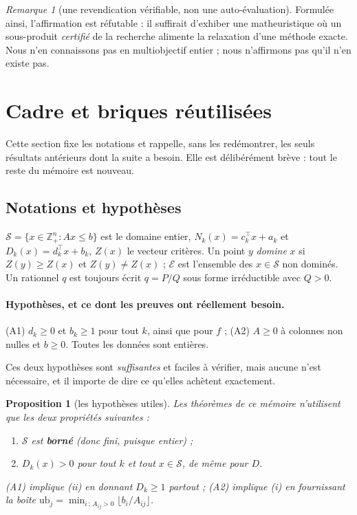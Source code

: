 \documentclass[11pt,a4paper]{article}
\theoremstyle{plain}
\newtheorem{proposition}[theorem]{Proposition}
\theoremstyle{remark}
\newtheorem{remark}{Remarque}
\newcommand{\Nk}{N_k}
\newcommand{\Dk}{D_k}
\newcommand{\Ecal}{\mathcal{E}}
\newcommand{\Scal}{\mathcal{S}}
\begin{document}
\begin{remark}[une revendication vérifiable, non une auto-évaluation]
Formulée ainsi, l'affirmation est réfutable : il suffirait d'exhiber une
matheuristique où un sous-produit \emph{certifié} de la recherche alimente
la relaxation d'une méthode exacte. Nous n'en connaissons pas en
multiobjectif entier ; nous n'affirmons pas qu'il n'en existe pas.
\end{remark}

\section{Cadre et briques réutilisées}
\label{sec:cadre}

Cette section fixe les notations et rappelle, sans les redémontrer, les
seuls résultats antérieurs dont la suite a besoin. Elle est délibérément
brève : tout le reste du mémoire est nouveau.

\subsection{Notations et hypothèses}

$\Scal=\{x\in\mathbb{Z}^n_+ : Ax\le b\}$ est le domaine entier,
$\Nk(x)=c_k^{\top}x+a_k$ et $\Dk(x)=d_k^{\top}x+b_k$, $Z(x)$ le vecteur
critères. Un point $y$ \emph{domine} $x$ si $Z(y)\ge Z(x)$ et $Z(y)\ne Z(x)$ ;
$\Ecal$ est l'ensemble des $x\in\Scal$ non dominés. Un rationnel $q$ est
toujours écrit $q=P/Q$ sous forme irréductible avec $Q>0$.

\paragraph{Hypothèses, et ce dont les preuves ont réellement besoin.}
(A1) $d_k\ge 0$ et $b_k\ge 1$ pour tout $k$, ainsi que pour $f$ ;
(A2) $A\ge 0$ à colonnes non nulles et $b\ge 0$. Toutes les données sont
entières.

Ces deux hypothèses sont \emph{suffisantes} et faciles à vérifier, mais
aucune n'est nécessaire, et il importe de dire ce qu'elles achètent
exactement.

\begin{proposition}[les hypothèses utiles]
\label{prop:hyp}
Les théorèmes de ce mémoire n'utilisent que les deux propriétés suivantes :
\begin{enumerate}[label=(\roman*),leftmargin=*,itemsep=1pt]
\item $\Scal$ est \textbf{borné} (donc fini, puisque entier) ;
\item $\Dk(x)>0$ pour tout $k$ et tout $x\in\Scal$, de même pour $D$.
\end{enumerate}
(A1) implique (ii) en donnant $\Dk\ge 1$ partout ; (A2) implique (i) en
fournissant la boîte $\text{ub}_j=\min_{i\,:\,A_{ij}>0}\lfloor
b_i/A_{ij}\rfloor$.
\end{proposition}
\end{document}
